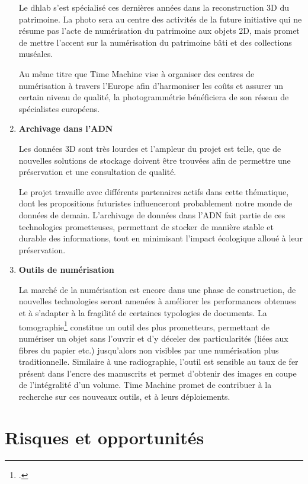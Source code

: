 \begin{enumerate}
Le \gls{dhlab} s'est spécialisé ces dernières années dans la reconstruction 3D du patrimoine. La \gls{photo} sera au centre des activités de la future initiative qui ne résume pas l'acte de numérisation du patrimoine aux objets 2D, mais promet de mettre l'accent sur la numérisation du patrimoine bâti et des collections muséales.

 Au même titre que Time Machine vise à organiser des centres de numérisation à travers l'Europe afin d'harmoniser les coûts et assurer un certain niveau de qualité, la photogrammétrie bénéficiera de son réseau de spécialistes européens.

\item \textbf{Archivage dans l'ADN}

Les données 3D sont très lourdes et l'ampleur du projet est telle, que de nouvelles solutions de stockage doivent être trouvées afin de permettre une préservation et une consultation de qualité. 

Le projet travaille avec différents partenaires actifs dans cette thématique, dont les propositions futuristes influenceront probablement notre monde de données de demain. L'archivage de données dans l'ADN fait partie de ces technologies prometteuses, permettant de stocker de manière stable et durable des informations, tout en minimisant l'impact écologique alloué à leur préservation. 

\item \textbf{Outils de numérisation}

La marché de la numérisation est encore dans une phase de construction, de nouvelles technologies seront amenées à améliorer les performances obtenues et à s'adapter à la fragilité de certaines typologies de documents. La tomographie\footcite{arte_tomography_nodate} constitue un outil des plus prometteurs, permettant de numériser un objet sans l'ouvrir et d'y déceler des particularités (liées aux fibres du papier etc.) jusqu'alors non visibles par une numérisation plus traditionnelle. Similaire à une radiographie, l'outil est sensible au taux de fer présent dans l'encre des manuscrits et permet d'obtenir des images en coupe de l'intégralité d'un volume. Time Machine promet de contribuer à la recherche sur ces nouveaux outils, et à leurs déploiements. 

\end{enumerate}


\chapter{Risques et opportunités}

